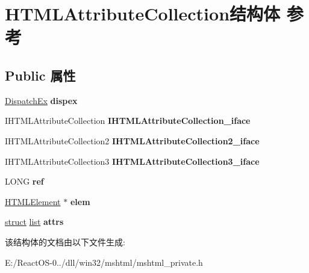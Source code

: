 \hypertarget{struct_h_t_m_l_attribute_collection}{}\section{H\+T\+M\+L\+Attribute\+Collection结构体 参考}
\label{struct_h_t_m_l_attribute_collection}
\subsection*{Public 属性}
\begin{DoxyCompactItemize}
\item 
\mbox{\label{struct_h_t_m_l_attribute_collection_a2c098d5f8b4ac9319d5614414a262f81}} 
\hyperlink{struct_dispatch_ex}{Dispatch\+Ex} {\bfseries dispex}
\item 
\mbox{\label{struct_h_t_m_l_attribute_collection_ac24aa8698513b287162acccd1bbcfa4d}} 
I\+H\+T\+M\+L\+Attribute\+Collection {\bfseries I\+H\+T\+M\+L\+Attribute\+Collection\+\_\+iface}
\item 
\mbox{\label{struct_h_t_m_l_attribute_collection_af83e0d19904430844e9c3f8fa1340127}} 
I\+H\+T\+M\+L\+Attribute\+Collection2 {\bfseries I\+H\+T\+M\+L\+Attribute\+Collection2\+\_\+iface}
\item 
\mbox{\label{struct_h_t_m_l_attribute_collection_a1618f53d3e94004c4f36fa7a2d682453}} 
I\+H\+T\+M\+L\+Attribute\+Collection3 {\bfseries I\+H\+T\+M\+L\+Attribute\+Collection3\+\_\+iface}
\item 
\mbox{\label{struct_h_t_m_l_attribute_collection_ad9546b70cc43476a7a41a2a71a88a474}} 
L\+O\+NG {\bfseries ref}
\item 
\mbox{\label{struct_h_t_m_l_attribute_collection_ab1436024e6393e4580bcabbd3ac24b61}} 
\hyperlink{struct_h_t_m_l_element}{H\+T\+M\+L\+Element} $\ast$ {\bfseries elem}
\item 
\mbox{\label{struct_h_t_m_l_attribute_collection_ab5fcc1c61d814b32cf52c24917476c70}} 
\hyperlink{interfacestruct}{struct} \hyperlink{classlist}{list} {\bfseries attrs}
\end{DoxyCompactItemize}


该结构体的文档由以下文件生成\+:\begin{DoxyCompactItemize}
\item 
E\+:/\+React\+O\+S-\/0../dll/win32/mshtml/mshtml\+\_\+private.\+h\end{DoxyCompactItemize}
